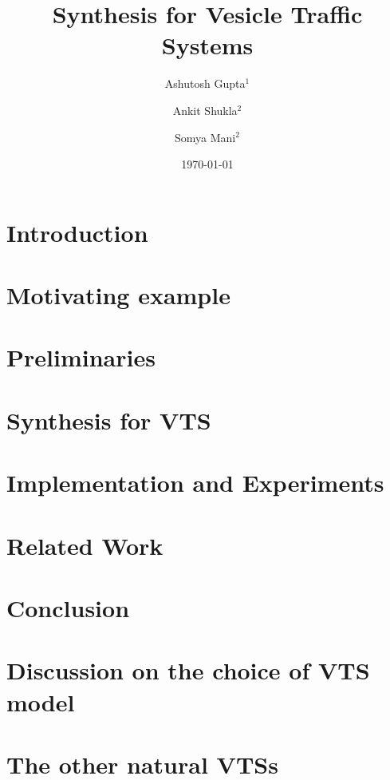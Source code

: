 \documentclass[draft]{llncs}
\begin{document}
\title{Synthesis for Vesicle Traffic Systems}

\author{Ashutosh Gupta$^1$ \and Ankit Shukla$^2$ \and Somya Mani$^2$}


\date{\today}

\maketitle

\begin{abstract}

\end{abstract}

\section{Introduction}
\label{sec:intro}


\section{Motivating example}
\label{sec:example}


\section{Preliminaries}
\label{sec:prelim}


\section{Synthesis for VTS}
\label{sec:encoding}


\section{Implementation and Experiments}
\label{sec:experiments}


\section{Related Work}
\label{sec:related}


\section{Conclusion}
\label{sec:conclusion}





\appendix
\clearpage

\section{Discussion on the choice of VTS model}
\label{sec:model}


\section{The other natural VTSs}
\label{sec:ex-vts}

\end{document}
